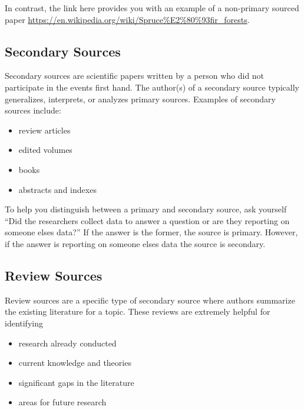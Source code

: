 \documentclass[
]{book}
\providecommand{\tightlist}{%
  \setlength{\itemsep}{0pt}\setlength{\parskip}{0pt}}
\begin{document}
In contrast, the link here provides you with an example of a non-primary sourced paper \url{https://en.wikipedia.org/wiki/Spruce\%E2\%80\%93fir_forests}.

\hypertarget{secondary-sources}{%
\subsection*{Secondary Sources}\label{secondary-sources}}

Secondary sources are scientific papers written by a person who did not participate in the events first hand. The author(s) of a secondary source typically generalizes, interprets, or analyzes primary sources. Examples of secondary sources include:

\begin{itemize}
\tightlist
\item
  review articles
\item
  edited volumes
\item
  books
\item
  abstracts and indexes
\end{itemize}

To help you distinguish between a primary and secondary source, ask yourself ``Did the researchers collect data to answer a question or are they reporting on someone else\textquotesingle s data?'' If the answer is the former, the source is primary. However, if the answer is reporting on someone else\textquotesingle s data the source is secondary.

\hypertarget{review-sources}{%
\subsection*{Review Sources}\label{review-sources}}

Review sources are a specific type of secondary source where authors summarize the existing literature for a topic. These reviews are extremely helpful for identifying

\begin{itemize}
\tightlist
\item
  research already conducted
\item
  current knowledge and theories
\item
  significant gaps in the literature
\item
  areas for future research
\end{itemize}
\end{document}
